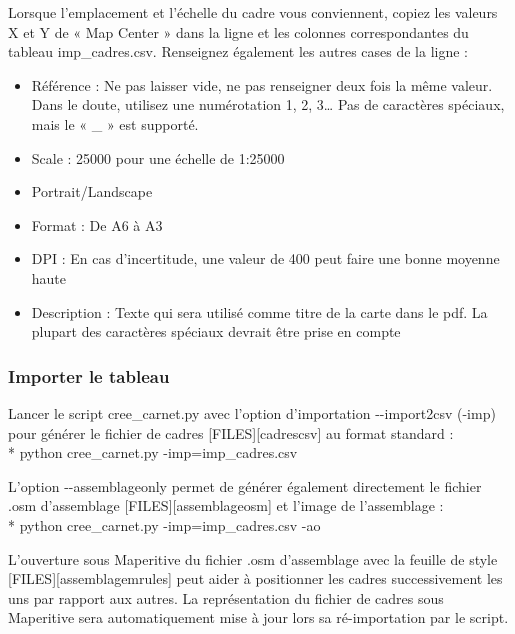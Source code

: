 \documentclass[12pt,french]{article}
\begin{document}
Lorsque l'emplacement et l'échelle du cadre vous conviennent, copiez les valeurs X et Y de « Map Center » dans la ligne et les colonnes correspondantes du tableau imp\_cadres.csv. Renseignez également les autres cases de la ligne : 
\begin{itemize}
\item Référence : Ne pas laisser vide, ne pas renseigner deux fois la même valeur. Dans le doute, utilisez une numérotation 1, 2, 3… Pas de caractères spéciaux, mais le « \_ » est supporté.
\item Scale : 25000 pour une échelle de {\shorthandoff{:}1:25000}
\item Portrait/Landscape
\item Format : De A6 à A3
\item DPI : En cas d'incertitude, une valeur de 400 peut faire une bonne moyenne haute
\item Description : Texte qui sera utilisé comme titre de la carte dans le pdf. La plupart des caractères spéciaux devrait être prise en compte
\end{itemize} \par 

\subsubsection{Importer le tableau}
Lancer le script cree\_carnet.py avec l'option d'importation -\mbox{}-import2csv (-imp) pour générer le fichier de cadres [FILES][cadrescsv] au format standard : \\*
python cree\_carnet.py -imp=imp\_cadres.csv \par 
L'option -\mbox{}-assemblageonly permet de générer également directement le fichier .osm d'assemblage [FILES][assemblageosm] et l'image de l'assemblage :\\* python cree\_carnet.py -imp=imp\_cadres.csv -ao \par 
L'ouverture sous Maperitive du fichier .osm d'assemblage avec la feuille de style [FILES][assemblagemrules] peut aider à positionner les cadres successivement les uns par rapport aux autres. La représentation du fichier de cadres sous Maperitive sera automatiquement mise à jour lors sa ré-importation par le script.
\end{document}
